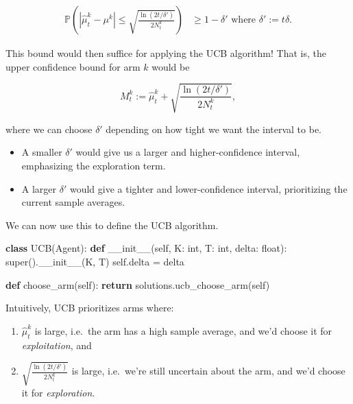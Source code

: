 \documentclass[
  letterpaper,
  DIV=11,
  numbers=noendperiod]{scrreprt}
\newenvironment{Shaded}{\begin{snugshade}}{\end{snugshade}}
\newcommand{\BuiltInTok}[1]{\textcolor[rgb]{0.00,0.23,0.31}{#1}}
\newcommand{\ControlFlowTok}[1]{\textcolor[rgb]{0.00,0.23,0.31}{\textbf{#1}}}
\newcommand{\FunctionTok}[1]{\textcolor[rgb]{0.28,0.35,0.67}{#1}}
\newcommand{\KeywordTok}[1]{\textcolor[rgb]{0.00,0.23,0.31}{\textbf{#1}}}
\newcommand{\NormalTok}[1]{\textcolor[rgb]{0.00,0.23,0.31}{#1}}
\newcommand{\OperatorTok}[1]{\textcolor[rgb]{0.37,0.37,0.37}{#1}}
\newcommand{\VariableTok}[1]{\textcolor[rgb]{0.07,0.07,0.07}{#1}}
\providecommand{\tightlist}{%
  \setlength{\itemsep}{0pt}\setlength{\parskip}{0pt}}\usepackage{longtable,booktabs,array}
\theoremstyle{plain}
\theoremstyle{plain}
\theoremstyle{definition}
\theoremstyle{definition}
\theoremstyle{remark}
\begin{document}
\[
\begin{aligned}
    \mathbb{P}\left( |\hat \mu^k_t - \mu^k | \le \sqrt{\frac{\ln(2t/\delta')}{2N^k_t}} \right) &\ge 1-\delta' \text{ where } \delta' := t \delta.
\end{aligned}
\]

This bound would then suffice for applying the UCB algorithm! That is,
the upper confidence bound for arm \(k\) would be

\[M^k_t := \hat \mu^k_t + \sqrt{\frac{\ln(2t/\delta')}{2N^k_t}},\]

where we can choose \(\delta'\) depending on how tight we want the
interval to be.

\begin{itemize}
\tightlist
\item
  A smaller \(\delta'\) would give us a larger and higher-confidence
  interval, emphasizing the exploration term.
\item
  A larger \(\delta'\) would give a tighter and lower-confidence
  interval, prioritizing the current sample averages.
\end{itemize}

We can now use this to define the UCB algorithm.

\begin{Shaded}
\begin{Highlighting}[]
\KeywordTok{class}\NormalTok{ UCB(Agent):}
    \KeywordTok{def} \FunctionTok{\_\_init\_\_}\NormalTok{(}\VariableTok{self}\NormalTok{, K: }\BuiltInTok{int}\NormalTok{, T: }\BuiltInTok{int}\NormalTok{, delta: }\BuiltInTok{float}\NormalTok{):}
        \BuiltInTok{super}\NormalTok{().}\FunctionTok{\_\_init\_\_}\NormalTok{(K, T)}
        \VariableTok{self}\NormalTok{.delta }\OperatorTok{=}\NormalTok{ delta}

    \KeywordTok{def}\NormalTok{ choose\_arm(}\VariableTok{self}\NormalTok{):}
        \ControlFlowTok{return}\NormalTok{ solutions.ucb\_choose\_arm(}\VariableTok{self}\NormalTok{)}
\end{Highlighting}
\end{Shaded}

Intuitively, UCB prioritizes arms where:

\begin{enumerate}
\def\labelenumi{\arabic{enumi}.}
\item
  \(\hat \mu^k_t\) is large, i.e.~the arm has a high sample average, and
  we'd choose it for \emph{exploitation}, and
\item
  \(\sqrt{\frac{\ln(2t/\delta')}{2N^k_t}}\) is large, i.e.~we're still
  uncertain about the arm, and we'd choose it for \emph{exploration}.
\end{enumerate}
\end{document}
